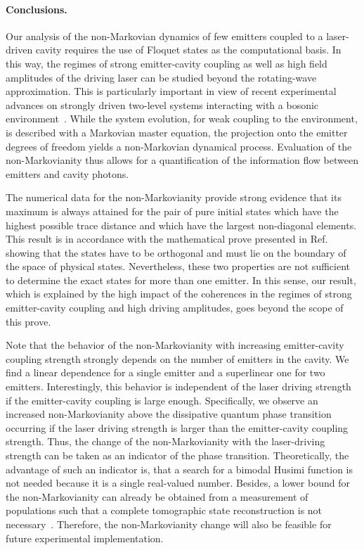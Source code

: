 \documentclass[aps,pra,twocolumn,showpacs,showkeys,10pt,nofootinbib]{revtex4-1}
\begin{document}
\paragraph*{Conclusions.}
Our analysis of the non-Markovian dynamics of few emitters coupled to a laser-driven cavity requires the use of Floquet states as the computational basis.
In this way, the regimes of strong emitter-cavity coupling as well as high field amplitudes of the driving laser can be studied beyond the rotating-wave approximation.
This is particularly important in view of recent experimental advances on strongly driven two-level systems interacting with a bosonic environment~\cite{rs17, xzsyjxlcy17}.
While the system evolution, for weak coupling to the environment, is described with a Markovian master equation, the projection onto the emitter degrees of freedom yields a non-Markovian dynamical process.
Evaluation of the non-Markovianity thus allows for a quantification of the information flow between emitters and cavity photons.

The numerical data for the non-Markovianity provide strong evidence that its maximum is always attained for the pair of pure initial states which have the highest possible trace distance and which have the largest non-diagonal elements.
This result is in accordance with the mathematical prove presented in Ref.~\cite{wklpb12} showing that the states have to be orthogonal and must lie on the boundary of the space of physical states.
Nevertheless, these two properties are not sufficient to determine the exact states for more than one emitter.
In this sense, our result, which is explained by the high impact of the coherences in the regimes of strong emitter-cavity coupling and high driving amplitudes, goes beyond the scope of this prove.

Note that the behavior of the non-Markovianity with increasing emitter-cavity coupling strength strongly depends on the number of emitters in the cavity.
We find a linear dependence for a single emitter and a superlinear one for two emitters.
Interestingly, this behavior is independent of the laser driving strength if the emitter-cavity coupling is large enough.
Specifically, we observe an increased non-Markovianity above the dissipative quantum phase transition occurring if the laser driving strength is larger than the emitter-cavity coupling strength.
Thus, the change of the non-Markovianity with the laser-driving strength can be taken as an indicator of the phase transition.
Theoretically, the advantage of such an indicator is, that a search for a bimodal Husimi function is not needed because it is a single real-valued number.
Besides, a lower bound for the non-Markovianity can already be obtained from a measurement of populations such that a complete tomographic state reconstruction is not necessary~\cite{xyf10}.
Therefore, the non-Markovianity change will also be feasible for future experimental implementation.
\end{document}
